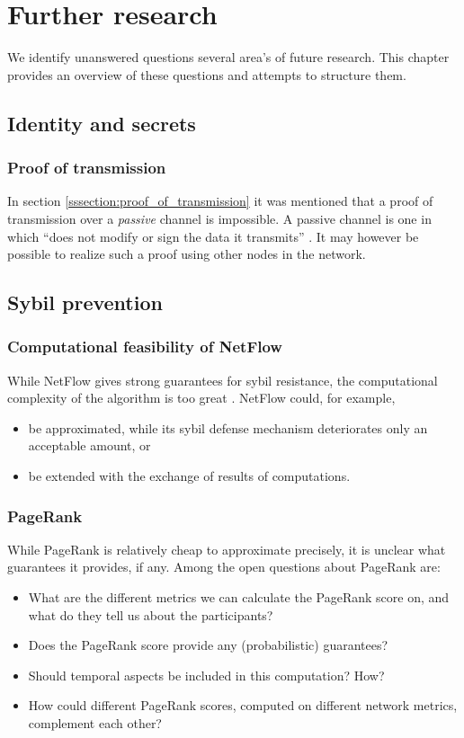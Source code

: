 \chapter{Further research}
We identify unanswered questions several area's of future research. 
This chapter provides an overview of these questions and attempts to structure them.

\section{Identity and secrets}
\subsection{Proof of transmission}
In section \ref{sssection:proof_of_transmission} it was mentioned that a proof of transmission over a \emph{passive} channel is impossible. 
A passive channel is one in which ``does not modify or sign the data it transmits'' \cite{kravchenko}. 
It may however be possible to realize such a proof using other nodes in the network.

\section{Sybil prevention}
\subsection{Computational feasibility of NetFlow}
While NetFlow gives strong guarantees for sybil resistance, the computational complexity of the algorithm is too great \cite{otte2016sybil}. NetFlow could, for example,
\begin{itemize}
	\item be approximated, while its sybil defense mechanism deteriorates only an acceptable amount, or
	\item be extended with the exchange of results of computations.
\end{itemize}

\subsection{PageRank}
While PageRank is relatively cheap to approximate precisely, it is unclear what guarantees it provides, if any. Among the open questions about PageRank are:
\begin{itemize}
	\item What are the different metrics we can calculate the PageRank score on, and what do they tell us about the participants?
	\item Does the PageRank score provide any (probabilistic) guarantees?
	\item Should temporal aspects be included in this computation? How?
	\item How could different PageRank scores, computed on different network metrics, complement each other?
\end{itemize}

